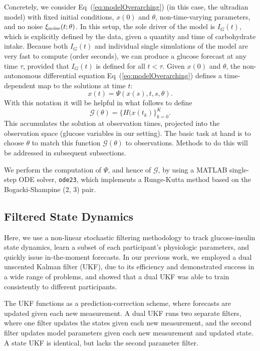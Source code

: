 \documentclass[10pt,letterpaper]{article}
\newcommand{\xin}{\xi_{\rm noise}}
\begin{document}
Concretely, we consider Eq~(\ref{eq:modelOverarching}) (in this case, the ultradian model) with fixed initial conditions, $x(0)$ and $\theta$, non-time-varying parameters, and no noise $\xin(t;\theta)$.
In this setup, the sole driver of the model is $I_G(t)$, which is explicitly defined by the data, given a quantity and time of carbohydrate intake. 
Because both $I_G(t)$ and individual single simulations of the model are very fast to compute (order seconds), we can produce a glucose forecast at any time $\tau$, provided that $I_G(t)$ is defined for all $t<\tau$. 
Given $x(0)$ and $\theta$, the non-autonomous differential equation 
Eq~(\ref{eq:modelOverarching}) defines a time-dependent map to the solutions at time $t$:
\begin{equation}
\label{eq:MAP}
x(t)=\Psi(x(s),t,s,\theta).
\end{equation}
With this notation it will be helpful in what follows to define
\begin{equation}
\label{eq:observe}
{\mathcal G}(\theta)=\{H\bigl(x(t_k)\bigr\}_{k=0}^{K}.
\end{equation}
This accumulates the solution at observation times, projected into the observation
space (glucose variables in our setting). The basic task at hand is to choose
$\theta$ to match this function ${\mathcal G}(\theta)$ to observations.
Methods to do this will be addressed in subsequent subsections.



We perform the computation of $\Psi$, and hence of ${\mathcal G}$, 
by using a MATLAB single-step ODE solver, \texttt{ode23}, which implements a Runge-Kutta method based on the Bogacki-Shampine (2, 3) pair.

\subsection{Filtered State Dynamics}
Here, we use a non-linear stochastic filtering methodology to track glucose-insulin state dynamics, learn a subset of each participant's physiologic parameters, and quickly issue in-the-moment forecasts. In our previous work, we employed a dual unscented Kalman filter (UKF), due to its efficiency and demonstrated success in a wide range of problems, and showed that a dual UKF was able to train consistently to different participants.

The UKF functions as a prediction-correction scheme, where forecasts are updated given each new measurement. A dual UKF runs two separate filters, where one filter updates the states given each new measurement, and the second filter updates model parameters given each new measurement and updated state. A state UKF is identical, but lacks the second parameter filter.
\end{document}
